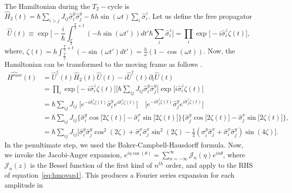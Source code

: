 \documentclass[12pt]{iopart}
\begin{document}
The Hamiltonian during the $T_2-$cycle is $\displaystyle \hat{H}_2(t) = \hbar\sum_{i>j} J_{ij}\hat{\sigma}^y_i\hat{\sigma}^y_j - \hbar h \sin(\omega t) \sum_i \hat{\sigma}^z_i$. Let us define the free propagator 
\begin{equation}
    \hat{U}(t) \equiv \exp \bigg[-\frac{i}{\hbar}\int_{\frac{T}{2}}^{\frac{T}{2}+t} (-h \sin(\omega t'))dt' \hbar\sum_i\hat{\sigma}^z_i\bigg]
    =\prod_{i} \exp\big[-i \hat{\sigma}^z_i\zeta(t)\big],
\end{equation}
where, $\displaystyle \zeta (t) = h\int_{\frac{T}{2}}^{\frac{T}{2}+t}  (-\sin(\omega t')dt') =\frac{h}{\omega}(1-\cos(\omega t))$.
Now, the Hamiltonian can be transformed to the moving frame as follows \cite{haldar_statistical_2022}.
\begin{align}
    \hat{H^{mov}}(t) &= \hat{U}^\dagger(t) \hat{H}_2(t) \hat{U}(t)- i \hat{U}^\dagger(t) \partial_t \hat{U}(t) \nonumber\\
    &= \prod_{i} \exp\big[-i\hat{\sigma}^z_i \zeta(t)\big] \big[\hbar\sum_{ij}J_{ij}\hat{\sigma}^y_i\hat{\sigma}^y_j\big] \exp\big[ i\hat{\sigma}^z_i \zeta(t)\big]\nonumber\\
    &= \hbar\sum_{ij} J_{ij}\;\big[ e^{-i\hat{\sigma}^z_i \zeta(t)} \hat{\sigma}^y_i e^{i\hat{\sigma}^z_i \zeta(t)}\big]\quad \big[e^{-i\hat{\sigma}^z_j  \zeta(t)}\hat{\sigma}^y_j e^{i\hat{\sigma}^z_j \zeta(t)}\big]\nonumber\\
    &=\hbar\sum_{ij}J_{ij}\Big\{\hat{\sigma}^y_i\cos{\big[2\zeta(t)\big]}-\hat{\sigma}^x_i\sin{\big[2\zeta(t)\big]}\Big\}\Big\{\hat{\sigma}^y_j\cos{\big[2\zeta(t)\big]}-\hat{\sigma}^x_j\sin{\big[2\zeta(t)\big]}\Big\},\nonumber\\
    &= \hbar\sum_{ij} J_{ij}  \Big[ \hat{\sigma}^y_i\hat{\sigma}^y_j\cos^2(2\zeta) +\hat{\sigma}^x_i\hat{\sigma}^x_j \sin^2(2\zeta) - \frac12 (\sigma^y_i\hat{\sigma}^x_j + \hat{\sigma}^x_i\hat{\sigma}^y_j)\sin(4\zeta)\Big].
    \label{eq:hmovap1}
\end{align}
In the penultimate step, we used the Baker-Campbell-Hausdorff formula. Now, we invoke the Jacobi-Anger expansion, $e^{i\eta \cos(\theta)} = \sum_{n=-\infty}^{\infty}\mathcal{J}_n(\eta)e^{in\theta}$, where $\mathcal{J}_n(z)$ is the Bessel function of the first kind of $n^{th}$ order, and apply to the RHS of  equation~\ref{eq:hmovap1}. This produces a Fourier series expansion for each amplitude in
\end{document}
